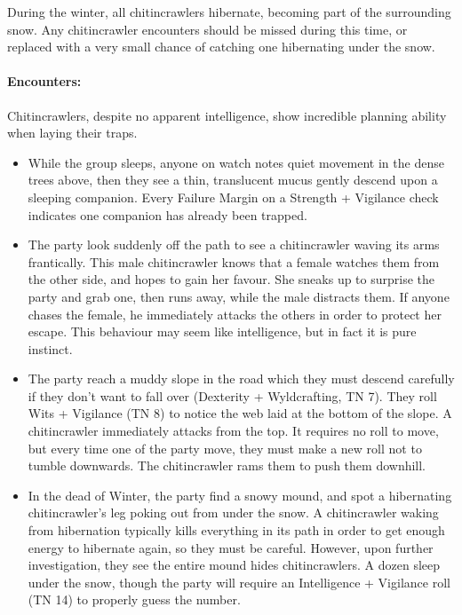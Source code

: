 \begin{multicols}{2}
During the winter, all chitincrawlers hibernate, becoming part of the surrounding snow.
Any chitincrawler encounters should be missed during this time, or replaced with a very small chance of catching one hibernating under the snow.

\paragraph{Encounters:} Chitincrawlers, despite no apparent intelligence, show incredible planning ability when laying their traps.

\begin{itemize}

  \item
  While the group sleeps, anyone on watch notes quiet movement in the dense trees above, then they see a thin, translucent mucus gently descend upon a sleeping companion.
  Every Failure Margin on a Strength + Vigilance check indicates one companion has already been trapped.
  \item
  The party look suddenly off the path to see a chitincrawler waving its arms frantically.
  This male chitincrawler knows that a female watches them from the other side, and hopes to gain her favour.
  She sneaks up to surprise the party and grab one, then runs away, while the male distracts them.
  If anyone chases the female, he immediately attacks the others in order to protect her escape.
  This behaviour may seem like intelligence, but in fact it is pure instinct.
  \item
  The party reach a muddy slope in the road which they must descend carefully if they don't want to fall over (Dexterity + Wyldcrafting, TN 7).
  They roll Wits + Vigilance (TN 8) to notice the web laid at the bottom of the slope.
  A chitincrawler immediately attacks from the top.
  It requires no roll to move, but every time one of the party move, they must make a new roll not to tumble downwards.
  The chitincrawler rams them to push them downhill.
  \item
  In the dead of Winter, the party find a snowy mound, and spot a hibernating chitincrawler's leg poking out from under the snow.
  A chitincrawler waking from hibernation typically kills everything in its path in order to get enough energy to hibernate again, so they must be careful.
  However, upon further investigation, they see the entire mound hides chitincrawlers.
  A dozen sleep under the snow, though the party will require an Intelligence + Vigilance roll (TN 14) to properly guess the number.
  


\end{itemize}
\end{multicols}

